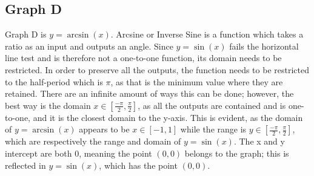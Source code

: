 \subsection{Graph D}

Graph D is ${y=\arcsin(x)}$.
Arcsine or Inverse Sine is a function which takes a ratio as an input and outputs an angle.
Since ${y=\sin(x)}$ fails the horizontal line test and is therefore not a one-to-one function, its domain needs to be restricted.
In order to preserve all the outputs, the function needs to be restricted to the half-period which is ${\pi}$, as that is the minimum value where they are retained.
There are an infinite amount of ways this can be done; however, the best way is the domain ${x \in {[\frac{-\pi}{2}, \frac{\pi}{2}]}}$, as all the outputs are contained and is one-to-one, and it is the closest domain to the y-axis.
This is evident, as the domain of ${y=\arcsin(x)}$ appears to be ${x \in {[{-1}, {1}]}}$ while the range is ${y \in {[\frac{-\pi}{2}, \frac{\pi}{2}]}}$, which are respectively the range and domain of ${y=\sin(x)}$.
The x and y intercept are both 0, meaning the point ${(0, 0)}$ belongs to the graph; this is reflected in ${y=\sin(x)}$, which has the point ${(0, 0)}$.

